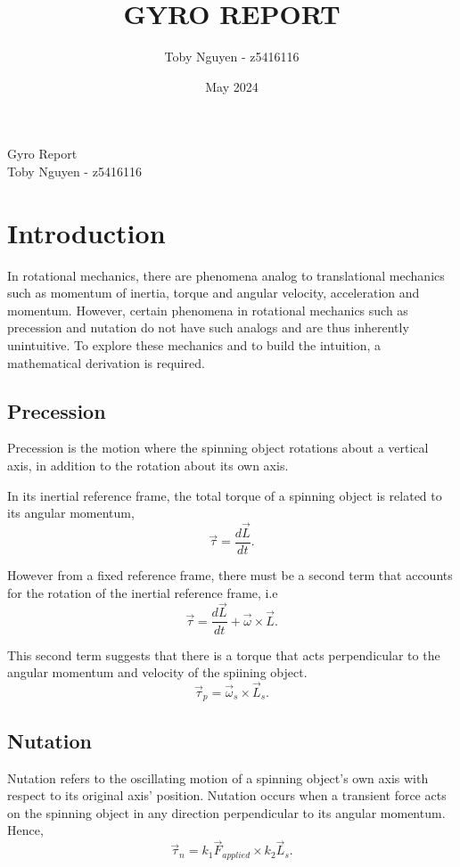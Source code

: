 \documentclass{article}
\title{GYRO REPORT}
\author{Toby Nguyen - z5416116}
\date{May 2024}
\begin{document}
\begin{center}
    \huge{Gyro Report} \\[10pt]
    \large{Toby Nguyen - z5416116}
\end{center}

\section*{Introduction}
In rotational mechanics, there are phenomena analog to translational mechanics
such as momentum of inertia, torque and angular velocity, acceleration and
momentum. However, certain phenomena in rotational mechanics such as precession
and nutation do not have such analogs and are thus inherently unintuitive. To 
explore these mechanics and to build the intuition, a mathematical derivation is required. 

\subsection*{Precession}
Precession is the motion where the spinning object rotations about a vertical axis, 
in addition to the rotation about its own axis.

In its inertial reference frame, the total torque of a spinning object is related to its angular momentum,
\begin{equation}
    \vec{\tau} = \frac{d\vec{L}}{dt}.
\end{equation}

However from a fixed reference frame, there must be a second term that accounts 
for the rotation of the inertial reference frame, i.e
\begin{equation}
    \vec{\tau} = \frac{d\vec{L}}{dt} + \vec{\omega} \times \vec{L}.
\end{equation}

This second term suggests that there is a torque that acts perpendicular to
the angular momentum and velocity of the spiining object. 
\begin{equation}
    \vec{\tau}_p = \vec{\omega}_s \times \vec{L}_s.
\end{equation}

\subsection*{Nutation}
Nutation refers to the oscillating motion of a spinning object's own axis with respect
to its original axis' position. Nutation occurs when a transient force acts on the 
spinning object in any direction perpendicular to its angular momentum. Hence,
\begin{equation}
    \vec{\tau}_n = k_1\vec{F}_{applied} \times k_2\vec{L}_s. 
\end{equation}
\end{document}
